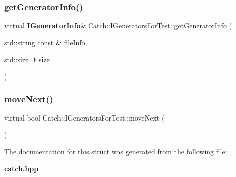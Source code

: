 \subsubsection{get\+Generator\+Info()}
{\footnotesize\ttfamily virtual \textbf{ I\+Generator\+Info}\& Catch\+::\+I\+Generators\+For\+Test\+::get\+Generator\+Info (\begin{DoxyParamCaption}\item[{std\+::string const \&}]{file\+Info,  }\item[{std\+::size\+\_\+t}]{size }\end{DoxyParamCaption})\hspace{0.3cm}{\ttfamily [pure virtual]}}

\mbox{\label{struct_catch_1_1_i_generators_for_test_adab31832d529fc584fd63164e0a1c8ad}} 
\subsubsection{move\+Next()}
{\footnotesize\ttfamily virtual bool Catch\+::\+I\+Generators\+For\+Test\+::move\+Next (\begin{DoxyParamCaption}{ }\end{DoxyParamCaption})\hspace{0.3cm}{\ttfamily [pure virtual]}}



The documentation for this struct was generated from the following file\+:\begin{DoxyCompactItemize}
\item 
\textbf{ catch.\+hpp}\end{DoxyCompactItemize}
